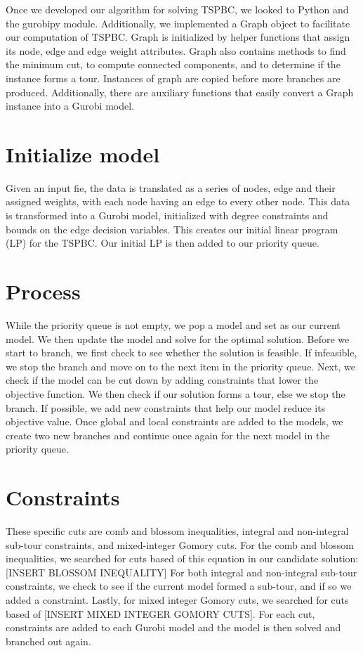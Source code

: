 \documentclass{article}
\begin{document}
Once we developed our algorithm for solving TSPBC,
we looked to Python and the gurobipy module.
Additionally, we implemented a Graph object
to facilitate our computation of TSPBC.
Graph is initialized
by helper functions
that assign its node, edge and edge weight attributes.
Graph also contains
methods to find the minimum cut,
to compute connected components,
and to determine if the instance forms a tour.
Instances of graph are copied
before more branches are produced.
Additionally, there are auxiliary functions
that easily convert
a Graph instance into a Gurobi model.

\section{Initialize model}
Given an input fie,
the data is translated
as a series of nodes,
edge and their assigned weights,
with each node having an edge
to every other node.
This data is transformed
into a Gurobi model,
initialized with degree constraints
and bounds on the edge decision variables.
This creates our initial linear program (LP)
for the TSPBC.
Our initial LP is then added to our priority queue.

\section{Process}
While the priority queue is not empty,
we pop a model
and set as our current model.
We then update the model
and solve for the optimal solution.
Before we start to branch,
we first check to see
whether the solution is feasible.
If infeasible,
we stop the branch
and move on to the next item in the priority queue.
Next, we check if the model
can be cut down
by adding constraints
that lower the objective function.
We then check
if our solution forms a tour,
else we stop the branch.
If possible,
we add new constraints
that help our model
reduce its objective value.
Once global and local constraints
are added to the models,
we create two new branches
and continue once again
for the next model
in the priority queue.

\section{Constraints}
These specific cuts
are comb and blossom inequalities,
integral and non-integral sub-tour constraints,
and mixed-integer Gomory cuts.
For the comb and blossom inequalities,
we searched for cuts based of this equation
in our candidate solution:
[INSERT BLOSSOM INEQUALITY]
For both integral and non-integral sub-tour constraints,
we check to see
if the current model formed a sub-tour,
and if so we added a constraint.
Lastly, for mixed integer Gomory cuts,
we searched for cuts based of
[INSERT MIXED INTEGER GOMORY CUTS].
For each cut,
constraints are added
to each Gurobi model
and the model is then solved
and branched out again.
\end{document}
